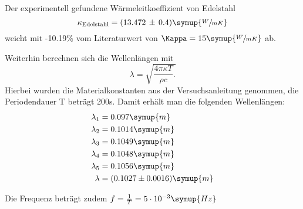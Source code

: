Der experimentell gefundene Wärmeleitkoeffizient von
Edelstahl 
\begin{equation*}
\kappa_{\text{Edelstahl}} = (13.472\, \pm \,0.4)\symup{\sfrac{W}{mK}} 
\end{equation*}
weicht mit -10.19\% vom Literaturwert von $\Kappa = 15 \symup{\sfrac{W}{mK}}$ ab.

Weiterhin berechnen sich die Wellenlängen mit
\begin{equation}
\lambda = \sqrt{\frac{4 \pi \kappa T}{\rho c}.}
\end{equation}
Hierbei wurden die Materialkonstanten aus der Versuchsanleitung genommen, die Periodendauer T beträgt 200s. Damit erhält man die 
folgenden Wellenlängen:
\begin{equation*}
\begin{aligned}
\lambda_1 &= 0.097\symup{m} \\
\lambda_2 &= 0.1014\symup{m} \\
\lambda_3 &= 0.1049\symup{m} \\
\lambda_4 &= 0.1048\symup{m} \\
\lambda_5 &= 0.1056\symup{m} \\
\lambda &= (0.1027 \pm 0.0016)\symup{m}
\end{aligned}
\end{equation*}

Die Frequenz beträgt zudem $f=\frac{1}{T}=5\cdot 10^{-3} \symup{Hz}$